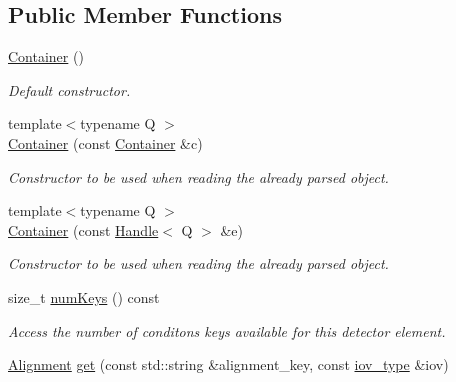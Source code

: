 \subsection*{Public Member Functions}
\begin{DoxyCompactItemize}
\item 
\hyperlink{class_d_d4hep_1_1_alignments_1_1_container_a17cf12ead74ea2c6359818a3b54668af}{Container} ()
\begin{DoxyCompactList}\small\item\em Default constructor. \item\end{DoxyCompactList}\item 
{\footnotesize template$<$typename Q $>$ }\\\hyperlink{class_d_d4hep_1_1_alignments_1_1_container_a28afaf22b27288ea423e7cbc79027eef}{Container} (const \hyperlink{class_d_d4hep_1_1_alignments_1_1_container}{Container} \&c)
\begin{DoxyCompactList}\small\item\em Constructor to be used when reading the already parsed object. \item\end{DoxyCompactList}\item 
{\footnotesize template$<$typename Q $>$ }\\\hyperlink{class_d_d4hep_1_1_alignments_1_1_container_a91f8253c2ad3e6c2d82b46a40d762b82}{Container} (const \hyperlink{class_d_d4hep_1_1_handle}{Handle}$<$ Q $>$ \&e)
\begin{DoxyCompactList}\small\item\em Constructor to be used when reading the already parsed object. \item\end{DoxyCompactList}\item 
size\_\-t \hyperlink{class_d_d4hep_1_1_alignments_1_1_container_ad423d94cea1ea683a5279fea77ece42d}{numKeys} () const 
\begin{DoxyCompactList}\small\item\em Access the number of conditons keys available for this detector element. \item\end{DoxyCompactList}\item 
\hyperlink{class_d_d4hep_1_1_alignments_1_1_alignment}{Alignment} \hyperlink{class_d_d4hep_1_1_alignments_1_1_container_a7a1e125b1ea376bc6a05a7a523418211}{get} (const std::string \&alignment\_\-key, const \hyperlink{class_d_d4hep_1_1_i_o_v}{iov\_\-type} \&iov)

\end{DoxyCompactItemize}
